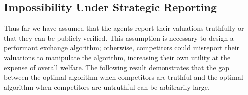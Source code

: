 
\subsection{Impossibility Under Strategic Reporting}

Thus far we have assumed that the agents report their valuations truthfully or that they can be publicly 
verified. This assumption is necessary to design a performant exchange algorithm; otherwise, competitors 
could misreport their valuations to manipulate the algorithm, increasing their own utility at the expense of overall welfare.
The following result demonstrates that the gap between the optimal algorithm when competitors are truthful and the optimal
algorithm when competitors are untruthful can be arbitrarily large.

